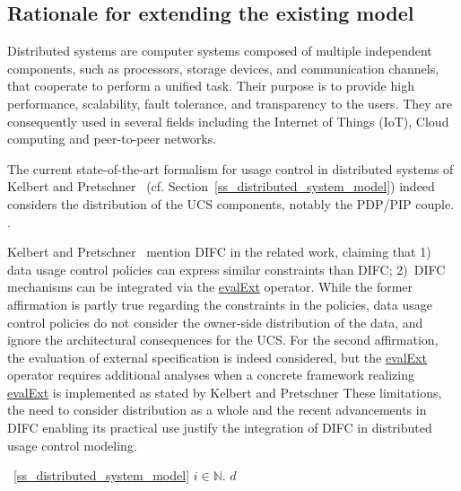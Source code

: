 \subsection{Rationale for extending the existing model}
\label{ss_motivation}

Distributed systems are computer systems composed of multiple independent components, such as processors, storage devices, and communication channels, that cooperate to perform a unified task. Their purpose is to provide high performance, scalability, fault tolerance, and transparency to the users. They are consequently used in several fields including the Internet of Things (IoT), Cloud computing and peer-to-peer networks.

The current state-of-the-art formalism for usage control in distributed systems of Kelbert and Pretschner~\cite{Kelbert2018} (cf. Section~\ref{ss_distributed_system_model}) indeed considers the distribution of the UCS components, notably the PDP/PIP couple.  \cite{Gil2023}. 

Kelbert and Pretschner~\cite{Kelbert2018} mention DIFC in the related work, claiming that 1) data usage control policies can express similar constraints than DIFC; 2)~DIFC mechanisms can be integrated via the  \underline{evalExt} operator. While the former affirmation is partly true regarding the constraints in the policies, data usage control policies do not consider the owner-side distribution of the data, and ignore the architectural consequences for the UCS. For the second affirmation, the evaluation of external specification is indeed considered, but the \underline{evalExt} operator requires additional analyses when a concrete framework realizing \underline{evalExt} is implemented as stated by Kelbert and Pretschner \cite{Kelbert2018}
These limitations, the need to consider distribution as a whole and the recent advancements in DIFC enabling its practical use justify the integration of DIFC in distributed usage control modeling.

 \ref{ss_distributed_system_model}  $i \in \mathbb{N}$. $d$  

